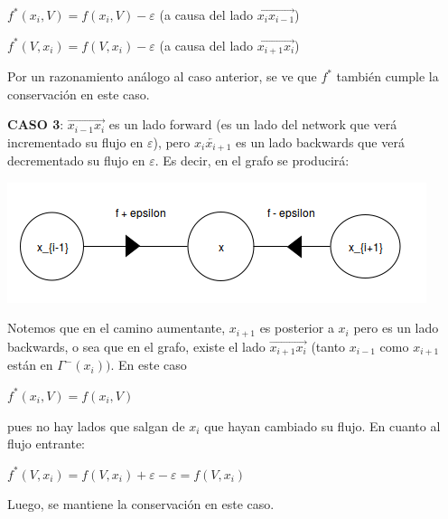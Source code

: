 \documentclass[10pt,a4paper]{article}
\begin{document}
\begin{center}
$f^*(x_i, V) = f(x_i, V) - \varepsilon$ (a causa del lado $\overrightarrow{x_{i}x_{i-1}}$)
\end{center}

\begin{center}
$f^*(V, x_i) = f(V,x_i) - \varepsilon$ (a causa del lado $\overrightarrow{x_{i+1}x_i}$)
\end{center}

Por un razonamiento análogo al caso anterior, se ve que $f^*$ también cumple la conservación en este caso.

\textbf{CASO 3}: $\overrightarrow{x_{i-1}x_{i}}$ es un lado forward (es un lado del network que verá incrementado su flujo en $\varepsilon$), pero $\overleftarrow{x_{i}x_{i+1}}$ es un lado backwards que verá decrementado su flujo en $\varepsilon$. Es decir, en el grafo se producirá:

\begin{center}

    \begin{adjustbox}{max size={\textwidth}{\textheight}}
        \includegraphics{definitions/f_estrella_4.png}
        \end{adjustbox}
    
\end{center}

Notemos que en el camino aumentante, $x_{i+1}$ es posterior a $x_i$ pero es un lado backwards, o sea que en el grafo, existe el lado $\overrightarrow{x_{i+1}x_{i}}$ (tanto $x_{i-1}$ como $x_{i+1}$ están en $\Gamma^-(x_i))$. En este caso

\begin{center}
$f^*(x_i, V) = f(x_i, V)$
\end{center}

pues no hay lados que salgan de $x_i$ que hayan cambiado su flujo. En cuanto al flujo entrante:

\begin{center}
$f^*(V, x_i) = f(V, x_i) + \varepsilon - \varepsilon = f(V, x_i)$
\end{center}

Luego, se mantiene la conservación en este caso.
\end{document}
